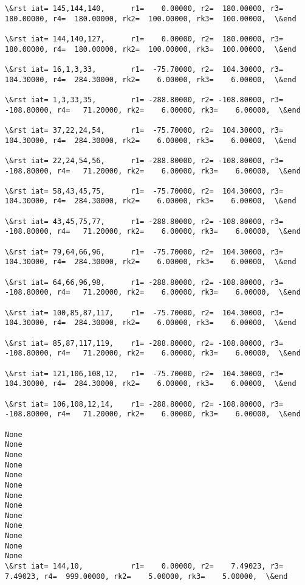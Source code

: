 \documentclass[11pt]{article}
\begin{document}
\begin{Verbatim}[commandchars=\\\{\}]
\&rst iat= 145,144,140,      r1=    0.00000, r2=  180.00000, r3=  180.00000, r4=  180.00000, rk2=  100.00000, rk3=  100.00000,  \&end

\&rst iat= 144,140,127,      r1=    0.00000, r2=  180.00000, r3=  180.00000, r4=  180.00000, rk2=  100.00000, rk3=  100.00000,  \&end

\&rst iat= 16,1,3,33,        r1=  -75.70000, r2=  104.30000, r3=  104.30000, r4=  284.30000, rk2=    6.00000, rk3=    6.00000,  \&end

\&rst iat= 1,3,33,35,        r1= -288.80000, r2= -108.80000, r3= -108.80000, r4=   71.20000, rk2=    6.00000, rk3=    6.00000,  \&end

\&rst iat= 37,22,24,54,      r1=  -75.70000, r2=  104.30000, r3=  104.30000, r4=  284.30000, rk2=    6.00000, rk3=    6.00000,  \&end

\&rst iat= 22,24,54,56,      r1= -288.80000, r2= -108.80000, r3= -108.80000, r4=   71.20000, rk2=    6.00000, rk3=    6.00000,  \&end

\&rst iat= 58,43,45,75,      r1=  -75.70000, r2=  104.30000, r3=  104.30000, r4=  284.30000, rk2=    6.00000, rk3=    6.00000,  \&end

\&rst iat= 43,45,75,77,      r1= -288.80000, r2= -108.80000, r3= -108.80000, r4=   71.20000, rk2=    6.00000, rk3=    6.00000,  \&end

\&rst iat= 79,64,66,96,      r1=  -75.70000, r2=  104.30000, r3=  104.30000, r4=  284.30000, rk2=    6.00000, rk3=    6.00000,  \&end

\&rst iat= 64,66,96,98,      r1= -288.80000, r2= -108.80000, r3= -108.80000, r4=   71.20000, rk2=    6.00000, rk3=    6.00000,  \&end

\&rst iat= 100,85,87,117,    r1=  -75.70000, r2=  104.30000, r3=  104.30000, r4=  284.30000, rk2=    6.00000, rk3=    6.00000,  \&end

\&rst iat= 85,87,117,119,    r1= -288.80000, r2= -108.80000, r3= -108.80000, r4=   71.20000, rk2=    6.00000, rk3=    6.00000,  \&end

\&rst iat= 121,106,108,12,   r1=  -75.70000, r2=  104.30000, r3=  104.30000, r4=  284.30000, rk2=    6.00000, rk3=    6.00000,  \&end

\&rst iat= 106,108,12,14,    r1= -288.80000, r2= -108.80000, r3= -108.80000, r4=   71.20000, rk2=    6.00000, rk3=    6.00000,  \&end

None
None
None
None
None
None
None
None
None
None
None
None
None
\&rst iat= 144,10,           r1=    0.00000, r2=    7.49023, r3=    7.49023, r4=  999.00000, rk2=    5.00000, rk3=    5.00000,  \&end


\end{Verbatim}
\end{document}
